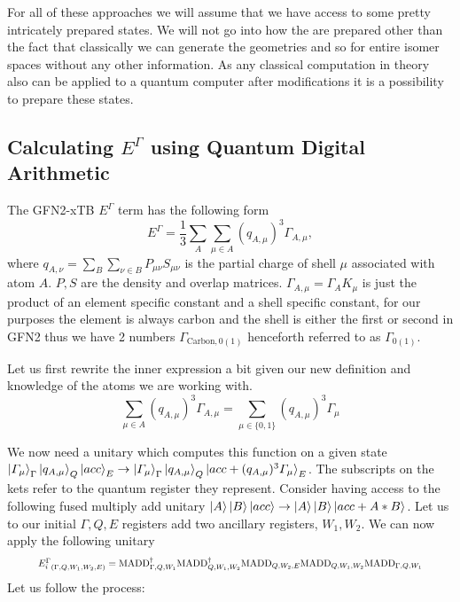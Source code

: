 \documentclass{article}
\begin{document}
For all of these approaches we will assume that we have access to some pretty intricately prepared states. 
We will not go into how the are prepared other than the fact that classically we can generate the geometries and so for entire isomer spaces without any other information. 
As any classical computation in theory also can be applied to a quantum computer after modifications it is a possibility to prepare these states. 


\subsection{Calculating $E^\Gamma$ using Quantum Digital Arithmetic}
The GFN2-xTB $E^\Gamma$ term has the following form\cite{bannwarth2021}
\begin{equation}
    E^\Gamma = \frac{1}{3}\sum_A\sum_{\mu\in A} (q_{A,\mu})^3\Gamma_{A,\mu},
\end{equation}
where $q_{A,\nu}=\sum_B\sum_{\nu\in B}P_{\mu\nu}S_{\mu\nu}$ is the partial charge of shell $\mu$ associated with atom $A$. $P, S$ are the density and overlap matrices. $\Gamma_{A,\mu} = \Gamma_A K_\mu$ is just the product of an element specific constant and a shell specific constant, for our purposes the element is always carbon and the shell is either the first or second in GFN2 thus we have 2 numbers $\Gamma_{\text{Carbon},0(1)}$ henceforth referred to as $\varGamma_{0(1)}$. 

\vspace{\baselineskip}
\noindent
Let us first rewrite the inner expression a bit given our new definition and knowledge of the atoms we are working with. 
\begin{equation}
    \sum_{\mu\in A} (q_{A,\mu})^3\Gamma_{A,\mu} = \sum_{\mu \in \{0,1\}} (q_{A,\mu})^3\varGamma_{\mu}
\end{equation}

We now need a unitary which computes this function on a given state $\ket{\varGamma_\mu}_\Gamma\ket{q_{A,\mu}}_Q\ket{acc}_E \to \ket{\varGamma_\mu}_\Gamma\ket{q_{A,\mu}}_Q\ket{acc+(q_{A,\mu})^3\varGamma_{\mu}}_E$. The subscripts on the kets refer to the quantum register they represent. 
Consider having access to the following fused multiply add unitary $\ket{A}\ket{B}\ket{acc} \to \ket{A}\ket{B}\ket{acc+A*B}$. 
Let us to our initial $\Gamma, Q, E$ registers add two ancillary registers, $W_1,W_2$. 
We can now apply the following unitary 
\begin{equation}
    \resizebox{.9\hsize}{!}{${E_i^\Gamma}_{(\Gamma,Q,W_1,W_2,E)} = \text{MADD}^\dagger_{\Gamma,Q,W_1}\text{MADD}^\dagger_{Q,W_1,W_2}\text{MADD}_{Q,W_2,E}\text{MADD}_{Q,W_1,W_2}\text{MADD}_{\Gamma,Q,W_1}$}
\end{equation}
Let us follow the process:
\end{document}
